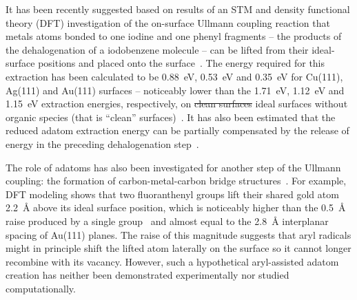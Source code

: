 \documentclass[aps,prb,amsmath,amssymb,11pt]{revtex4-1}
\newcommand{\zhzh}{\color{blue}}
\begin{document}
It has been recently suggested based on results of an STM and density functional theory (DFT) investigation of the on-surface Ullmann coupling reaction that metals atoms bonded to one iodine and one phenyl fragments -- the products of the dehalogenation of a iodobenzene molecule -- can be lifted from their ideal-surface positions and placed onto the surface~\cite{chemeurope2017}. 
The energy required for this extraction has been calculated to be \SI{0.88}{\electronvolt}, \SI{0.53}{\electronvolt} and \SI{0.35}{\electronvolt} for Cu(111), Ag(111) and Au(111) surfaces -- noticeably lower than the \SI{1.71}{\electronvolt}, \SI{1.12}{\electronvolt} and \SI{1.15}{\electronvolt} extraction energies, respectively, on \sout{clean surfaces} {\zhzh ideal surfaces without organic species (that is ``clean'' surfaces)}~\cite{chemeurope2017}. %
%
It has also been estimated that the reduced adatom extraction energy can be partially compensated by the release of energy in the preceding dehalogenation step~\cite{chemeurope2017}. %

The role of adatoms has also been investigated for another step of the Ullmann coupling: the formation of carbon-metal-carbon bridge structures~\cite{acsnano2017, jpcc2018, acsnano2019}. 
For example, DFT modeling shows that two fluoranthenyl groups lift their shared gold atom \SI{2.2}{\angstrom} above its ideal surface position, which is noticeably higher than the \SI{0.5}{\angstrom} raise produced by a single group~\cite{jpcc2018} and almost equal to the 
\SI{2.8}{\angstrom} interplanar spacing of Au(111) planes.
The raise of this magnitude suggests that aryl radicals might in principle shift the lifted atom laterally on the surface so it cannot longer recombine with its vacancy. However, such a hypothetical aryl-assisted adatom creation has neither been demonstrated experimentally nor studied computationally.
\end{document}
